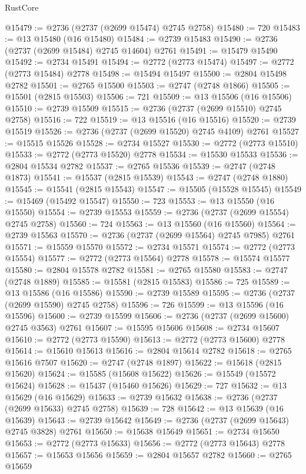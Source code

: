 \begin{lexlean}{RustCore}
\begin{coremodule}
@15479 := @2736 (@2737 (@2699 @15474) @2745 @2758)
@15480 := 720
@15483 := @13 @15480 (@16 @15480)
@15484 := @2739 @15483
@15490 := @2736 (@2737 (@2699 @15484) @2745 @14604) @2761
@15491 := @15479 @15490
@15492 := @2734 @15491
@15494 := @2772 (@2773 @15474)
@15497 := @2772 (@2773 @15484) @2778
@15498 := @15494 @15497
@15500 := @2804 @15498 @2782
@15501 := @2765 @15500
@15503 := @2747 (@2748 @1866)
@15505 := @15501 (@2815 @15503)
@15506 := 721
@15509 := @13 @15506 (@16 @15506)
@15510 := @2739 @15509
@15515 := @2736 (@2737 (@2699 @15510) @2745 @2758)
@15516 := 722
@15519 := @13 @15516 (@16 @15516)
@15520 := @2739 @15519
@15526 := @2736 (@2737 (@2699 @15520) @2745 @4109) @2761
@15527 := @15515 @15526
@15528 := @2734 @15527
@15530 := @2772 (@2773 @15510)
@15533 := @2772 (@2773 @15520) @2778
@15534 := @15530 @15533
@15536 := @2804 @15534 @2782
@15537 := @2765 @15536
@15539 := @2747 (@2748 @1873)
@15541 := @15537 (@2815 @15539)
@15543 := @2747 (@2748 @1880)
@15545 := @15541 (@2815 @15543)
@15547 := @15505 (@15528 @15545)
@15549 := @15469 (@15492 @15547)
@15550 := 723
@15553 := @13 @15550 (@16 @15550)
@15554 := @2739 @15553
@15559 := @2736 (@2737 (@2699 @15554) @2745 @2758)
@15560 := 724
@15563 := @13 @15560 (@16 @15560)
@15564 := @2739 @15563
@15570 := @2736 (@2737 (@2699 @15564) @2745 @7985) @2761
@15571 := @15559 @15570
@15572 := @2734 @15571
@15574 := @2772 (@2773 @15554)
@15577 := @2772 (@2773 @15564) @2778
@15578 := @15574 @15577
@15580 := @2804 @15578 @2782
@15581 := @2765 @15580
@15583 := @2747 (@2748 @1889)
@15585 := @15581 (@2815 @15583)
@15586 := 725
@15589 := @13 @15586 (@16 @15586)
@15590 := @2739 @15589
@15595 := @2736 (@2737 (@2699 @15590) @2745 @2758)
@15596 := 726
@15599 := @13 @15596 (@16 @15596)
@15600 := @2739 @15599
@15606 := @2736 (@2737 (@2699 @15600) @2745 @3563) @2761
@15607 := @15595 @15606
@15608 := @2734 @15607
@15610 := @2772 (@2773 @15590)
@15613 := @2772 (@2773 @15600) @2778
@15614 := @15610 @15613
@15616 := @2804 @15614 @2782
@15618 := @2765 @15616 @7507
@15620 := @2747 (@2748 @1897)
@15622 := @15618 (@2815 @15620)
@15624 := @15585 (@15608 @15622)
@15626 := @15549 (@15572 @15624)
@15628 := @15437 (@15460 @15626)
@15629 := 727
@15632 := @13 @15629 (@16 @15629)
@15633 := @2739 @15632
@15638 := @2736 (@2737 (@2699 @15633) @2745 @2758)
@15639 := 728
@15642 := @13 @15639 (@16 @15639)
@15643 := @2739 @15642
@15649 := @2736 (@2737 (@2699 @15643) @2745 @3828) @2761
@15650 := @15638 @15649
@15651 := @2734 @15650
@15653 := @2772 (@2773 @15633)
@15656 := @2772 (@2773 @15643) @2778
@15657 := @15653 @15656
@15659 := @2804 @15657 @2782
@15660 := @2765 @15659

\end{coremodule}
\end{lexlean}
